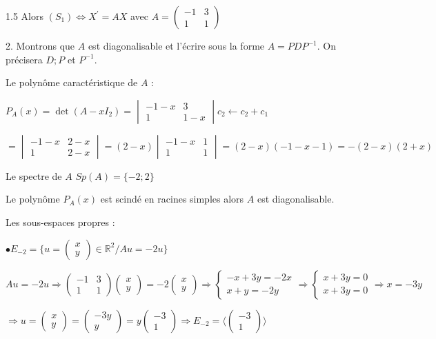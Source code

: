 \documentclass[12pt]{article}
\begin{document}
\begin{spacing}{1.5}
Alors $(S_1)\Longleftrightarrow X^{\prime} = AX$ avec $A=\begin{pmatrix}
-1 & 3 \\
1 & 1
\end{pmatrix}$


2. Montrons que $A$ est diagonalisable et l'écrire sous la forme $A=PDP^{-1}$. On précisera $D; P$ et $P^{-1}$.

Le polynôme caractéristique de $A$ :

$P_A(x)=\det(A-xI_2)=\begin{vmatrix}
-1-x & 3\\
1 & 1-x
\end{vmatrix}c_2\longleftarrow c_2+c_1$ 

$=\begin{vmatrix}
-1-x & 2-x\\
1 & 2-x
\end{vmatrix}=(2-x)\begin{vmatrix}
-1-x & 1\\
1 & 1
\end{vmatrix}=(2-x)(-1-x-1)=-(2-x)(2+x)$

Le spectre de $A$ $Sp(A)=\{-2;2\}$

Le polynôme $P_A(x)$ est scindé en racines simples alors $A$ est diagonalisable.

Les sous-espaces propres :

$\bullet E_{-2}=\{u=\begin{pmatrix}
x\\
y
\end{pmatrix}\in \mathbb{R}^2/Au=-2u\}$

$Au=-2u\Rightarrow \begin{pmatrix}
-1 & 3 \\
1 & 1
\end{pmatrix}\begin{pmatrix}
x\\
y
\end{pmatrix}=-2\begin{pmatrix}
x\\
y
\end{pmatrix}\Rightarrow \begin{cases}
-x+3y=-2x\\
x+y=-2y
\end{cases}\Rightarrow\begin{cases}
x+3y=0\\
x+3y=0
\end{cases}\Rightarrow x=-3y$

$\Rightarrow u=\begin{pmatrix}
x\\
y
\end{pmatrix}=\begin{pmatrix}
-3y\\
y
\end{pmatrix}=y\begin{pmatrix}
-3\\
1
\end{pmatrix}\Rightarrow E_{-2}=\langle \begin{pmatrix}
-3\\
1
\end{pmatrix}\rangle$



\end{spacing}
\end{document}
